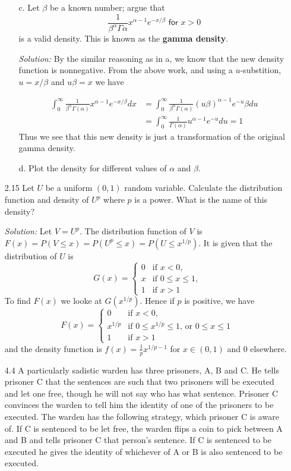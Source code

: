 \documentclass{article}
\begin{document}
\begin{enumerate}
\begin{enumerate}
\item[c.] Let $\beta$ be a known number; argue that
\[
\frac{1}{\beta^\alpha\Gamma{\alpha}}x^{\alpha-1}e^{-x/\beta} \textsf{ for } x>0
\]
is a valid density. This is known as the \textbf{gamma density}.

\textit{Solution:} By the similar reasoning as in a, we know that the new density function is nonnegative. From the above work, and using a $u$-substition, $u=x/\beta$ and $u \beta = x$ we have

\begin{align*}
\int_{0}^\infty\frac{1}{\beta^\alpha\Gamma(\alpha)}x^{\alpha-1}e^{-x/\beta}dx
&= \int_{0}^\infty\frac{1}{\beta^\alpha\Gamma(\alpha)}(u\beta)^{\alpha-1}e^{-u}\beta du \\
&= \int_{0}^\infty \frac{1}{\Gamma(\alpha)}u^{\alpha-1}e^{-u} du = 1
\end{align*}
Thus we see that this new density is just a transformation of the original gamma density.

\item[d.] Plot the density for different values of $\alpha$ and $\beta$.

\end{enumerate}

\item[2.15] Let $U$ be a uniform $(0,1)$ random variable. Calculate the distribution function and density of $U^p$ where $p$ is a power. What is the name of this density?

\textit{Solution:} Let $V=U^p$. The distribution function of $V$ is $F(x) = P(V \leq x) = P(U^p \leq x) = P(U \leq x^{1/p})$. It is given that the distribution of $U$ is
\[
G(x)=
\begin{cases}
0 & \text{if $x < 0$,} \\
x & \text{if $0 \leq x \leq 1$,} \\
1 & \text{if $x > 1$}
\end{cases}
\]
To find $F(x)$ we looke at $G(x^{1/p})$. Hence if $p$ is positive, we have
\[
F(x) =
\begin{cases}
0 & \text{if $x < 0$,} \\
x^{1/p}& \text{if $0 \leq x^{1/p} \leq 1$, or $0 \leq x \leq 1$} \\
1 & \text{if $x > 1$}
\end{cases}
\]
and the density function is $f(x) = \frac{1}{p}x^{1/p - 1}$ for $x \in (0,1)$ and $0$ elsewhere. 

\item[4.4] A particularly sadistic warden has three prisoners, A, B and C. He tells prisoner C that the sentences are such that two prisoners will be executed and let one free, though he will not say who has what sentence. Prisoner C convinces the warden to tell him the identity of one of the prisoners to be executed. The warden has the following strategy, which prisoner C is aware of. If C is sentenced to be let free, the warden flips a coin to pick between A and B and tells prisoner C that person’s sentence. If C is sentenced to be executed he gives the identity of whichever of A or B is also sentenced to be executed.


\end{enumerate}
\end{document}
